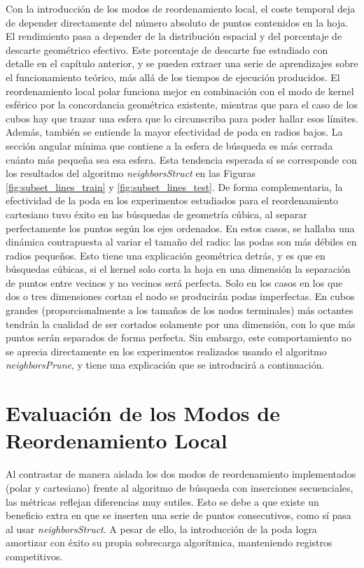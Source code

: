 Con la introducción de los modos de reordenamiento local, el coste temporal deja de depender directamente del número absoluto de puntos contenidos en la hoja. El rendimiento pasa a depender de la distribución espacial y del porcentaje de descarte geométrico efectivo. Este porcentaje de descarte fue estudiado con detalle en el capítulo anterior, y se pueden extraer una serie de aprendizajes sobre el funcionamiento teórico, más allá de los tiempos de ejecución producidos. El reordenamiento local polar funciona mejor en combinación con el modo de  kernel esférico por la concordancia geométrica existente, mientras que para el caso de los cubos hay que trazar una esfera que lo circunscriba para poder hallar esos límites. Además, también se entiende la mayor efectividad de poda en radios bajos. La sección angular mínima que contiene a la esfera de búsqueda es más cerrada cuánto más pequeña sea esa esfera. Esta tendencia esperada sí se corresponde con los resultados del algoritmo \textit{neighborsStruct} en las Figuras \ref{fig:subset_lines_train} y \ref{fig:subset_lines_test}. De forma complementaria, la efectividad de la poda en los experimentos estudiados para el reordenamiento cartesiano tuvo éxito en las búsquedas de geometría cúbica, al separar perfectamente los puntos según los ejes ordenados. En estos casos, se hallaba una dinámica contrapuesta al variar el tamaño del radio: las podas son más débiles en radios pequeños. Esto tiene una explicación geométrica detrás, y es que en búsquedas cúbicas, si el kernel solo corta la hoja en una dimensión la separación de puntos entre vecinos y no vecinos será perfecta. Solo en los casos en los que dos o tres dimensiones cortan el nodo se producirán podas imperfectas. En cubos grandes (proporcionalmente a los tamaños de los nodos terminales) más octantes tendrán la cualidad de ser cortados solamente por una dimensión, con lo que más puntos serán separados de forma perfecta. Sin embargo, este comportamiento no se aprecia directamente en los experimentos realizados usando el algoritmo \textit{neighborsPrune}, y tiene una explicación que se introducirá a continuación.


\section{Evaluación de los Modos de Reordenamiento Local}

Al contrastar de manera aislada los dos modos de reordenamiento implementados (polar y cartesiano) frente al algoritmo de búsqueda con inserciones secuenciales, las métricas reflejan diferencias muy sutiles. Esto se debe a que existe un beneficio extra en que se inserten una serie de puntos consecutivos, como sí pasa al usar \textit{neighborsStruct}. A pesar de ello, la introducción de la poda logra amortizar con éxito su propia sobrecarga algorítmica, manteniendo registros competitivos.

